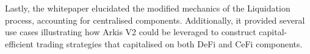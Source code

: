 \documentclass[conference]{IEEEtran}
\begin{document}
Lastly, the whitepaper elucidated the modified mechanics of the Liquidation process, accounting for centralised components. Additionally, it provided several use cases illustrating how Arkis V2 could be leveraged to construct capital-efficient trading strategies that capitalised on both DeFi and CeFi components.






\newpage

\begin{appendices}
\end{appendices}
\end{document}
